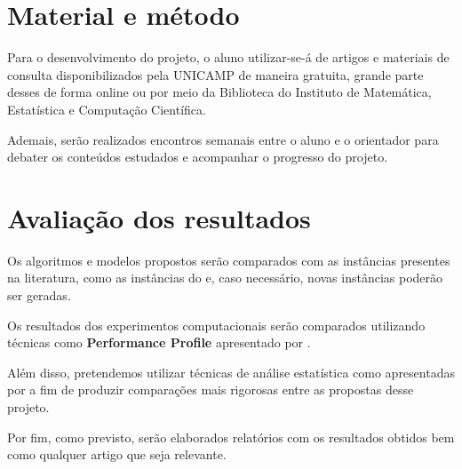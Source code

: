 \documentclass[11pt]{article}
\begin{document}
\section{Material e método}
\label{sec:orgf073a61}
Para o desenvolvimento do projeto, o aluno utilizar-se-á de artigos e materiais de consulta disponibilizados pela UNICAMP de maneira gratuita, grande parte desses de forma online ou por meio da Biblioteca do Instituto de Matemática, Estatística e Computação Científica.

Ademais, serão realizados encontros semanais entre o aluno e o orientador para debater os conteúdos estudados e acompanhar o progresso do projeto.

\section{Avaliação dos resultados}
\label{sec:orgdf2424d}
Os algoritmos e modelos propostos serão comparados com as instâncias presentes na literatura, como as instâncias do \textcite{DIMACSGraphColoringInstances} e, caso necessário, novas instâncias poderão ser geradas.

Os resultados dos experimentos computacionais serão comparados utilizando técnicas como \textbf{Performance Profile} apresentado por \textcite{Dolan2002Benchmarkingoptimizationsoftware}.

Além disso, pretendemos utilizar técnicas de análise estatística como apresentadas por \textcite{Derrac2011practicaltutorialuse} a fim de produzir comparações mais rigorosas entre as propostas desse projeto.

Por fim, como previsto, serão elaborados relatórios com os resultados obtidos bem como qualquer artigo que seja relevante.

\printbibliography
\end{document}
